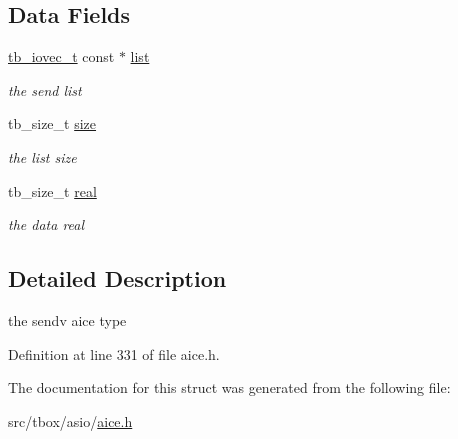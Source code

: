 \subsection*{Data Fields}
\begin{DoxyCompactItemize}
\item 
\hypertarget{structtb__aice__sendv__t_ac82ebb4af9cde31e71bfb22ef7f9d260}{\hyperlink{structtb__iovec__t}{tb\-\_\-iovec\-\_\-t} const $\ast$ \hyperlink{structtb__aice__sendv__t_ac82ebb4af9cde31e71bfb22ef7f9d260}{list}}\label{structtb__aice__sendv__t_ac82ebb4af9cde31e71bfb22ef7f9d260}

\begin{DoxyCompactList}\small\item\em the send list \end{DoxyCompactList}\item 
\hypertarget{structtb__aice__sendv__t_a3a83f172784263f30879e6b75ed12f29}{tb\-\_\-size\-\_\-t \hyperlink{structtb__aice__sendv__t_a3a83f172784263f30879e6b75ed12f29}{size}}\label{structtb__aice__sendv__t_a3a83f172784263f30879e6b75ed12f29}

\begin{DoxyCompactList}\small\item\em the list size \end{DoxyCompactList}\item 
\hypertarget{structtb__aice__sendv__t_aef41441e0b5dbfe08346392d92ed1393}{tb\-\_\-size\-\_\-t \hyperlink{structtb__aice__sendv__t_aef41441e0b5dbfe08346392d92ed1393}{real}}\label{structtb__aice__sendv__t_aef41441e0b5dbfe08346392d92ed1393}

\begin{DoxyCompactList}\small\item\em the data real \end{DoxyCompactList}\end{DoxyCompactItemize}


\subsection{Detailed Description}
the sendv aice type 

Definition at line 331 of file aice.\-h.



The documentation for this struct was generated from the following file\-:\begin{DoxyCompactItemize}
\item 
src/tbox/asio/\hyperlink{aice_8h}{aice.\-h}\end{DoxyCompactItemize}
